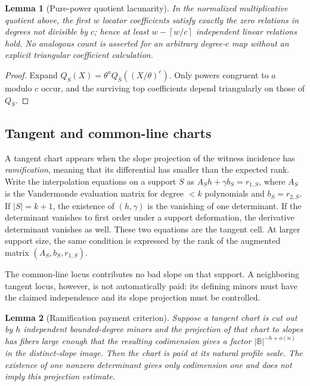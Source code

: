 \documentclass[12pt,a4paper]{amsart}
\numberwithin{equation}{section}
\newtheorem{lemma}[lemma]{Lemma}
\theoremstyle{remark}
\newcommand{\B}{\mathbb B}
\newcommand{\abs}[1]{\lvert #1\rvert}
\newcommand{\ceil}[1]{\left\lceil #1\right\rceil}
\begin{document}
\begin{lemma}[Pure-power quotient lacunarity]\label{lem:quotient-lacunarity-expanded}
In the normalized multiplicative quotient above, the first \(w\) locator
coefficients satisfy exactly the zero relations in degrees not divisible
by \(c\); hence at least \(w-\ceil{w/c}\) independent linear relations
hold.  No analogous count is asserted for an arbitrary degree-\(c\) map
without an explicit triangular coefficient calculation.
\end{lemma}

\begin{proof}
Expand
\(Q_S(X)=\theta^aQ_{\bar S}((X/\theta)^c)\).  Only powers congruent to
\(a\) modulo \(c\) occur, and the surviving top coefficients depend
triangularly on those of \(Q_{\bar S}\).
\end{proof}

\subsection*{Tangent and common-line charts}
A tangent chart appears when the slope projection of the witness incidence
has \emph{ramification}, meaning that its differential has smaller than
the expected rank.  Write the interpolation equations on a support \(S\)
as \(A_S h+\gamma b_S=r_{1,S}\), where \(A_S\) is the Vandermonde
evaluation matrix for degree \(<k\) polynomials and \(b_S=r_{2,S}\).  If
\(\abs S=k+1\), the existence of \((h,\gamma)\) is the vanishing of one
determinant.  If the determinant vanishes to first order under a support
deformation, the derivative determinant vanishes as well.  These two
equations are the tangent cell.  At larger support size, the same condition
is expressed by the rank of the augmented matrix
\((A_S,b_S,r_{1,S})\).

The common-line locus contributes no bad slope on that support.  A
neighboring tangent locus, however, is not automatically paid: its defining
minors must have the claimed independence and its slope projection must be
controlled.

\begin{lemma}[Ramification payment criterion]\label{lem:ramification-payment-expanded}
Suppose a tangent chart is cut out by \(h\) independent bounded-degree
minors and the projection of that chart to slopes has fibers large enough
that the resulting codimension gives a factor \(\abs\B^{-h+o(n)}\) in the
distinct-slope image.  Then the chart is paid at its natural profile scale.
The existence of one nonzero determinant gives only codimension one and
does not imply this projection estimate.
\end{lemma}
\end{document}
